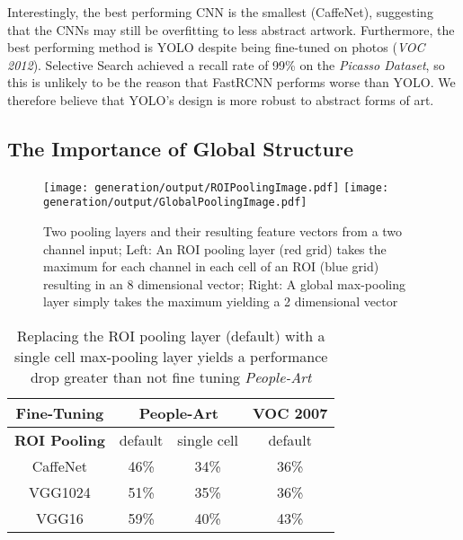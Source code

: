 \documentclass[runningheads]{llncs}
\begin{document}
Interestingly, the best performing \ac{CNN} is the smallest (CaffeNet), suggesting that the \acp{CNN} may still be overfitting to less abstract \ac{artwork}.
Furthermore, the best performing method is \ac{YOLO} despite being fine-tuned on \acp{photo} (\textit{VOC 2012}).
Selective Search achieved a recall rate of 99\%  on the \textit{Picasso Dataset}, so this is unlikely to be the reason that \ac{FastRCNN} performs worse than \ac{YOLO}.
We therefore believe that \ac{YOLO}'s design is more robust to abstract forms of art.
 
\subsection{The Importance of Global Structure}
\label{sec:structure}
\begin{figure}[b]
  \hfill
  \texttt{[image: generation/output/ROIPoolingImage.pdf]} \hfill
  \texttt{[image: generation/output/GlobalPoolingImage.pdf]}
  \hfill
  \caption{Two pooling layers and their resulting feature vectors from a two channel input; Left: An ROI pooling layer (red grid) takes the maximum for each channel in each cell of an ROI (blue grid) resulting in an 8 dimensional vector; Right: A global max-pooling layer simply takes the maximum yielding a 2 dimensional vector\label{fig:ROIPool}}
\end{figure}

\begin{table}[t]
  \begin{center}
    \caption{Replacing the \ac{ROI} pooling layer (default) with a single cell max-pooling layer yields a performance drop greater than not fine tuning \textit{People-Art} \label{tbl:PerformanceStructure}}
\begin{tabular}{c|ccc}
  \hline 

  \textbf{Fine-Tuning} & \multicolumn{2}{c}{People-Art} & VOC 2007  \\ 

  \hline 

  \textbf{ROI Pooling} & default & single cell & default  \\ 
  \hline
  CaffeNet & 46\% & 34\% & 36\% \\ 
  VGG1024 & 51\% & 35\% & 36\% \\ 
  VGG16 & 59\% & 40\% & 43\% \\ 
  \hline
\end{tabular}   \end{center}
\end{table}
\end{document}
